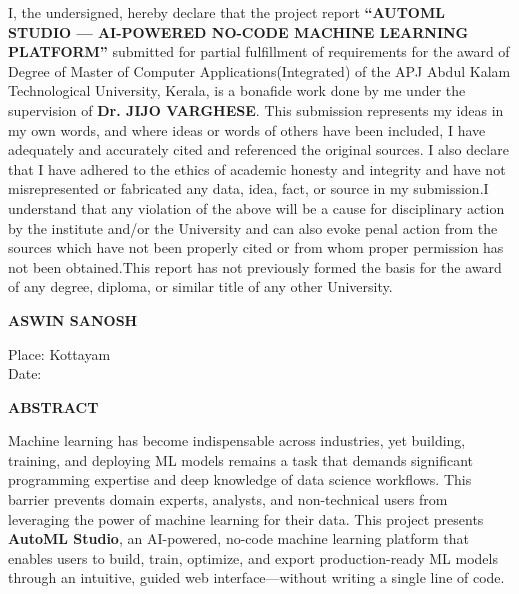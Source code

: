 \documentclass[12pt,a4paper]{report}
\begin{document}
I, the undersigned, hereby declare that the project report
\textbf{``AUTOML STUDIO — AI-POWERED NO-CODE MACHINE LEARNING PLATFORM''} submitted for partial
fulfillment of requirements for the award of Degree of Master of Computer Applications(Integrated) of the APJ Abdul Kalam Technological University, Kerala,
is a bonafide work done by me under the supervision of
\textbf{Dr. JIJO VARGHESE}. This submission represents my ideas in my own words, and where ideas or words of others have been included, I have adequately and accurately cited and referenced the original sources. I also declare that I have adhered to the ethics of academic honesty and integrity and have not misrepresented or fabricated any data, idea, fact, or source in my submission.I understand that any violation of the above will be a cause for disciplinary action by the institute and/or the University and can also evoke penal action from the sources which have not been properly cited or from whom proper permission has not been obtained.This report has not previously formed the basis for the award of any degree, diploma, or similar title of any other University.

\vspace{2cm}

\begin{flushright}
\textbf{ASWIN SANOSH}
\end{flushright}

\noindent
Place: Kottayam\\
Date:


\newpage
\thispagestyle{empty}

\begin{center}
{\fontsize{16pt}{18pt}\selectfont\textbf{ABSTRACT}}
\end{center}

\vspace{1cm}
Machine learning has become indispensable across industries, yet building, training, and deploying ML models remains a task that demands significant programming expertise and deep knowledge of data science workflows. This barrier prevents domain experts, analysts, and non-technical users from leveraging the power of machine learning for their data. This project presents \textbf{AutoML Studio}, an AI-powered, no-code machine learning platform that enables users to build, train, optimize, and export production-ready ML models through an intuitive, guided web interface—without writing a single line of code.
\end{document}

